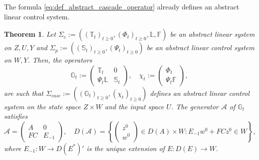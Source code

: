 \documentclass[10pt]{article}
\newtheorem{Theorem}{Theorem}[section]
\begin{document}
The formula \eqref{eq:def_abstract_cascade_operator} already defines an abstract linear control system. 
\begin{Theorem}\label{theo:abstract_control_system}
Let $\Sigma_c :=((\mathbb{T}_t)_{t \geq 0},(\Phi_t)_{t \geq 0},\mathbb{L}, \mathbb{F})$ be an abstract linear system on $Z,U,Y$ and $\Sigma_p := ((\mathbb{S}_t)_{t \geq 0},(\Psi_t)_{t \geq 0})$ be an abstract linear control system on $W,Y$. Then, the operators 
\begin{equation}\label{eq:def_cascade}
\mathbb{G}_t := \left( \begin{array}{cc}
\mathbb{T}_t & 0 \\
\Psi_t \mathbb{L} & \mathbb{S}_t
\end{array} \right) ,\quad \chi_t :=  \left( \begin{array}{c}
\Phi_t\\
\Psi_t \mathbb{F}
\end{array} \right),
\end{equation}
are such that $\Sigma_{casc} := ((\mathbb{G}_t)_{t \geq 0},(\chi_t)_{t \geq 0})$ defines an abstract linear control system on the state space $Z \times W$ and the input space $U$. The generator $\mathcal{A}$ of $\mathbb{G}_t$ satisfies 
\[
\mathcal{A} = \left( \begin{array}{cc}
A & 0 \\
FC & E_{-1}
\end{array} \right),\quad D(\mathcal{A}) = \left\lbrace \left( \begin{array}{c}
z^0 \\
w^0
\end{array} \right) \in D(A) \times W : E_{-1}w^0 + FCz^0 \in W  \right\rbrace,
\]
where $E_{-1} : W \to D(E^*)'$ is the unique extension of $E : D(E) \to W$.
\end{Theorem}
\end{document}
